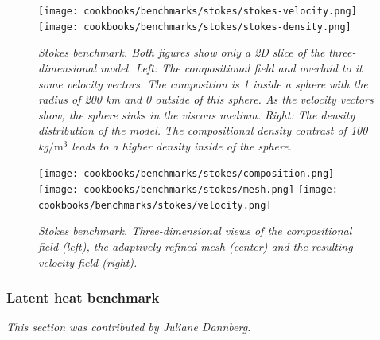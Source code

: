 \documentclass{article}
\begin{document}
\begin{figure}
  \begin{center}
    \texttt{[image: cookbooks/benchmarks/stokes/stokes-velocity.png]}
    \hfill
    \texttt{[image: cookbooks/benchmarks/stokes/stokes-density.png]}
  \end{center}
  \caption{\it Stokes benchmark. Both figures show only a 2D slice of the
      three-dimensional model.
      Left: The compositional field and overlaid to it some velocity vectors.
      The composition is 1 inside a sphere with the radius of 200 km and 0
      outside of this sphere. As the velocity vectors show, the sphere sinks
      in the viscous medium.
      Right: The density distribution of the model. The compositional density
      contrast of 100 kg$/\text{m}^3$ leads to a higher density inside of the
      sphere.}
  \label{fig:stokes-falling-sphere-2d}
\end{figure}

\begin{figure}
  \begin{center}
    \texttt{[image: cookbooks/benchmarks/stokes/composition.png]}
    \hfill
    \texttt{[image: cookbooks/benchmarks/stokes/mesh.png]}
    \hfill
    \texttt{[image: cookbooks/benchmarks/stokes/velocity.png]}
  \end{center}
  \caption{\it Stokes benchmark. Three-dimensional views of the compositional
  field (left), the adaptively refined mesh (center) and the resulting velocity field
  (right).}
  \label{fig:stokes-falling-sphere-3d}
\end{figure}


\subsubsection{Latent heat benchmark}
\label{sec:benchmark-latent_heat}

\textit{This section was contributed by Juliane Dannberg.}
\end{document}
